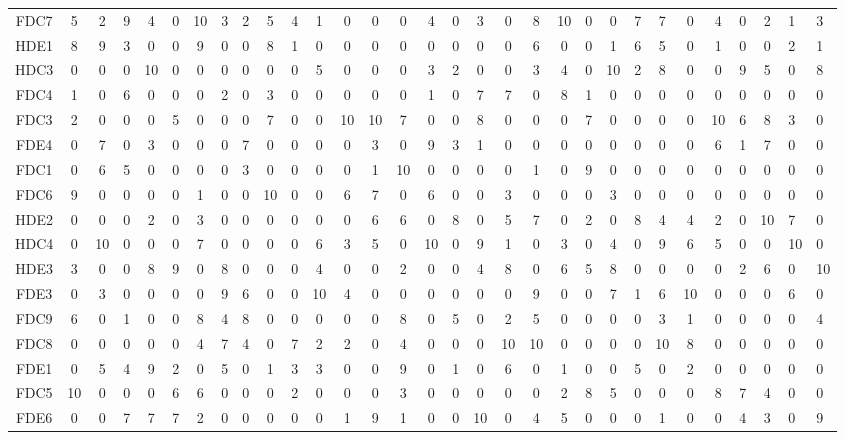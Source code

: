 \documentclass{article}
\begin{document}
\begin{tabular}{|c|cccccccccccccccccccccccccccc|}
	FDC7 & 5 & 2 & 9 & 4 & 0 & 10 & 3 & 2 & 5 & 4 & 1 & 0 & 0 & 0 & 4 & 0 & 3 & 0 & 8 & 10 & 0 & 0 & 7 & 7 & 0 & 4 & 0 & 2 & 1 & 3 \\
	HDE1 & 8 & 9 & 3 & 0 & 0 & 9 & 0 & 0 & 8 & 1 & 0 & 0 & 0 & 0 & 0 & 0 & 0 & 0 & 6 & 0 & 0 & 1 & 6 & 5 & 0 & 1 & 0 & 0 & 2 & 1 \\
	HDC3 & 0 & 0 & 0 & 10 & 0 & 0 & 0 & 0 & 0 & 0 & 5 & 0 & 0 & 0 & 3 & 2 & 0 & 0 & 3 & 4 & 0 & 10 & 2 & 8 & 0 & 0 & 9 & 5 & 0 & 8 \\
	FDC4 & 1 & 0 & 6 & 0 & 0 & 0 & 2 & 0 & 3 & 0 & 0 & 0 & 0 & 0 & 1 & 0 & 7 & 7 & 0 & 8 & 1 & 0 & 0 & 0 & 0 & 0 & 0 & 0 & 0 & 0 \\
	FDC3 & 2 & 0 & 0 & 0 & 5 & 0 & 0 & 0 & 7 & 0 & 0 & 10 & 10 & 7 & 0 & 0 & 8 & 0 & 0 & 0 & 7 & 0 & 0 & 0 & 0 & 10 & 6 & 8 & 3 & 0 \\
	FDE4 & 0 & 7 & 0 & 3 & 0 & 0 & 0 & 7 & 0 & 0 & 0 & 0 & 3 & 0 & 9 & 3 & 1 & 0 & 0 & 0 & 0 & 0 & 0 & 0 & 0 & 6 & 1 & 7 & 0 & 0 \\
	FDC1 & 0 & 6 & 5 & 0 & 0 & 0 & 0 & 3 & 0 & 0 & 0 & 0 & 1 & 10 & 0 & 0 & 0 & 0 & 1 & 0 & 9 & 0 & 0 & 0 & 0 & 0 & 0 & 0 & 0 & 0 \\
	FDC6 & 9 & 0 & 0 & 0 & 0 & 1 & 0 & 0 & 10 & 0 & 0 & 6 & 7 & 0 & 6 & 0 & 0 & 3 & 0 & 0 & 0 & 3 & 0 & 0 & 0 & 0 & 0 & 0 & 0 & 0 \\
	HDE2 & 0 & 0 & 0 & 2 & 0 & 3 & 0 & 0 & 0 & 0 & 0 & 0 & 6 & 6 & 0 & 8 & 0 & 5 & 7 & 0 & 2 & 0 & 8 & 4 & 4 & 2 & 0 & 10 & 7 & 0 \\
	HDC4 & 0 & 10 & 0 & 0 & 0 & 7 & 0 & 0 & 0 & 0 & 6 & 3 & 5 & 0 & 10 & 0 & 9 & 1 & 0 & 3 & 0 & 4 & 0 & 9 & 6 & 5 & 0 & 0 & 10 & 0 \\
	HDE3 & 3 & 0 & 0 & 8 & 9 & 0 & 8 & 0 & 0 & 0 & 4 & 0 & 0 & 2 & 0 & 0 & 4 & 8 & 0 & 6 & 5 & 8 & 0 & 0 & 0 & 0 & 2 & 6 & 0 & 10 \\
	FDE3 & 0 & 3 & 0 & 0 & 0 & 0 & 9 & 6 & 0 & 0 & 10 & 4 & 0 & 0 & 0 & 0 & 0 & 0 & 9 & 0 & 0 & 7 & 1 & 6 & 10 & 0 & 0 & 0 & 6 & 0 \\
	FDC9 & 6 & 0 & 1 & 0 & 0 & 8 & 4 & 8 & 0 & 0 & 0 & 0 & 0 & 8 & 0 & 5 & 0 & 2 & 5 & 0 & 0 & 0 & 0 & 3 & 1 & 0 & 0 & 0 & 0 & 4 \\
	FDC8 & 0 & 0 & 0 & 0 & 0 & 4 & 7 & 4 & 0 & 7 & 2 & 2 & 0 & 4 & 0 & 0 & 0 & 10 & 10 & 0 & 0 & 0 & 0 & 10 & 8 & 0 & 0 & 0 & 0 & 0 \\
	FDE1 & 0 & 5 & 4 & 9 & 2 & 0 & 5 & 0 & 1 & 3 & 3 & 0 & 0 & 9 & 0 & 1 & 0 & 6 & 0 & 1 & 0 & 0 & 5 & 0 & 2 & 0 & 0 & 0 & 0 & 0 \\
	FDC5 & 10 & 0 & 0 & 0 & 6 & 6 & 0 & 0 & 0 & 2 & 0 & 0 & 0 & 3 & 0 & 0 & 0 & 0 & 0 & 2 & 8 & 5 & 0 & 0 & 0 & 8 & 7 & 4 & 0 & 0 \\
	FDE6 & 0 & 0 & 7 & 7 & 7 & 2 & 0 & 0 & 0 & 0 & 0 & 1 & 9 & 1 & 0 & 0 & 10 & 0 & 4 & 5 & 0 & 0 & 0 & 1 & 0 & 0 & 4 & 3 & 0 & 9 \\
	\hline
\end{tabular}
	
\end{document}
